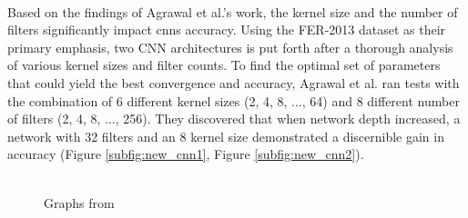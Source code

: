 \\
\indent Based on the findings of Agrawal et al.'s work, the kernel size and the number of filters significantly impact \gls{cnns} accuracy.
Using the FER-2013 dataset as their primary emphasis, two CNN architectures is put forth after a thorough analysis of various kernel sizes and filter counts.
To find the optimal set of parameters that could yield the best convergence and accuracy, Agrawal et al. ran tests with the combination of 6 different kernel sizes (2, 4, 8, ..., 64) and 8 different number of filters (2, 4, 8, ..., 256). 
They discovered that when network depth increased, a network with 32 filters and an 8 kernel size demonstrated a discernible gain in accuracy (Figure \ref{subfig:new_cnn1}, Figure \ref{subfig:new_cnn2}).
\\
\begin{figure}[!ht]
    \centering
    \qquad
    \vspace{0.5cm}
    \\
    \scriptsize{Graphs from \cite{agrawal_2019_using}}
\end{figure}
